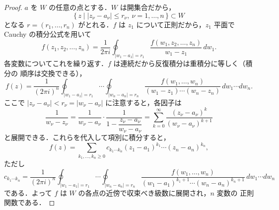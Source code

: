 \begin{proof}
$a$ を $W$ の任意の点とする．$W$ は開集合だから，
\[
  \{\, z \mid |z_\nu - a_\nu| \le r_\nu,\ \nu = 1, \dots, n \,\} \subset W
\]
となる $r = (r_1, \dots, r_n)$ がとれる．$f$ は $z_1$ について正則だから，$z_1$ 平面で
Cauchy の積分公式を用いて
\[
  f(z_1, z_2, \dots, z_n)
  = \frac{1}{2\pi i} \oint_{|w_1 - a_1| = r_1}
      \frac{f(w_1, z_2, \dots, z_n)}{w_1 - z_1}\, dw_1 .
\]
各変数についてこれを繰り返す．$f$ は連続だから反復積分は重積分に等しく（積分の
順序は交換できる），
\[
  f(z) = \frac{1}{(2\pi i)^n}
    \oint_{|w_1 - a_1| = r_1} \!\!\!\! \cdots \oint_{|w_n - a_n| = r_n}
    \frac{f(w_1, \dots, w_n)}{(w_1 - z_1) \cdots (w_n - z_n)}\, dw_1 \cdots dw_n .
\]
ここで $|z_\nu - a_\nu| < r_\nu = |w_\nu - a_\nu|$ に注意すると，各因子は
\[
  \frac{1}{w_\nu - z_\nu}
  = \frac{1}{w_\nu - a_\nu} \cdot
    \frac{1}{1 - \dfrac{z_\nu - a_\nu}{w_\nu - a_\nu}}
  = \sum_{k=0}^\infty \frac{(z_\nu - a_\nu)^k}{(w_\nu - a_\nu)^{k+1}}
\]
と展開できる．これらを代入して項別に積分すると，
\[
  f(z) = \sum_{k_1, \dots, k_n \ge 0}
    c_{k_1 \cdots k_n} (z_1 - a_1)^{k_1} \cdots (z_n - a_n)^{k_n} ,
\]
ただし
\[
  c_{k_1 \cdots k_n} = \frac{1}{(2\pi i)^n}
    \oint_{|w_1 - a_1| = r_1} \!\!\!\! \cdots \oint_{|w_n - a_n| = r_n}
    \frac{f(w_1, \dots, w_n)}
         {(w_1 - a_1)^{k_1 + 1} \cdots (w_n - a_n)^{k_n + 1}}\, dw_1 \cdots dw_n
\]
である．よって $f$ は $W$ の各点の近傍で収束べき級数に展開され，$n$ 変数の
正則関数である．
\end{proof}
